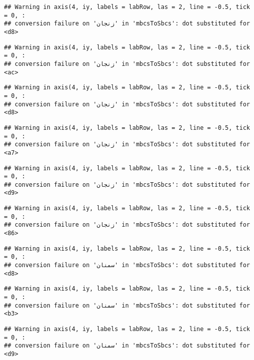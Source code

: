 \documentclass[
]{article}
\begin{document}
\begin{verbatim}
## Warning in axis(4, iy, labels = labRow, las = 2, line = -0.5, tick = 0, :
## conversion failure on 'زنجان' in 'mbcsToSbcs': dot substituted for <d8>
\end{verbatim}

\begin{verbatim}
## Warning in axis(4, iy, labels = labRow, las = 2, line = -0.5, tick = 0, :
## conversion failure on 'زنجان' in 'mbcsToSbcs': dot substituted for <ac>
\end{verbatim}

\begin{verbatim}
## Warning in axis(4, iy, labels = labRow, las = 2, line = -0.5, tick = 0, :
## conversion failure on 'زنجان' in 'mbcsToSbcs': dot substituted for <d8>
\end{verbatim}

\begin{verbatim}
## Warning in axis(4, iy, labels = labRow, las = 2, line = -0.5, tick = 0, :
## conversion failure on 'زنجان' in 'mbcsToSbcs': dot substituted for <a7>
\end{verbatim}

\begin{verbatim}
## Warning in axis(4, iy, labels = labRow, las = 2, line = -0.5, tick = 0, :
## conversion failure on 'زنجان' in 'mbcsToSbcs': dot substituted for <d9>
\end{verbatim}

\begin{verbatim}
## Warning in axis(4, iy, labels = labRow, las = 2, line = -0.5, tick = 0, :
## conversion failure on 'زنجان' in 'mbcsToSbcs': dot substituted for <86>
\end{verbatim}

\begin{verbatim}
## Warning in axis(4, iy, labels = labRow, las = 2, line = -0.5, tick = 0, :
## conversion failure on 'سمنان' in 'mbcsToSbcs': dot substituted for <d8>
\end{verbatim}

\begin{verbatim}
## Warning in axis(4, iy, labels = labRow, las = 2, line = -0.5, tick = 0, :
## conversion failure on 'سمنان' in 'mbcsToSbcs': dot substituted for <b3>
\end{verbatim}

\begin{verbatim}
## Warning in axis(4, iy, labels = labRow, las = 2, line = -0.5, tick = 0, :
## conversion failure on 'سمنان' in 'mbcsToSbcs': dot substituted for <d9>
\end{verbatim}
\end{document}
